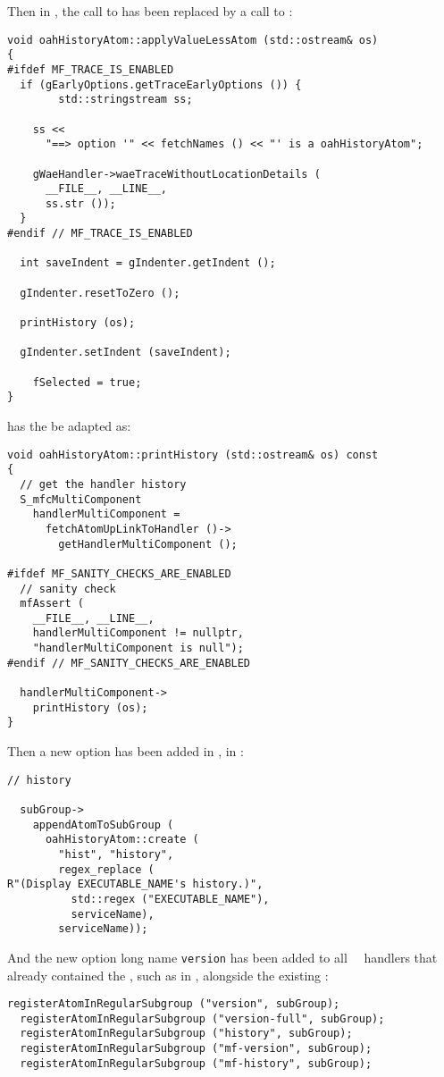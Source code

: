 Then in , the call to  has been replaced by a call to :
\begin{lstlisting}[language=CPlusPlus]
void oahHistoryAtom::applyValueLessAtom (std::ostream& os)
{
#ifdef MF_TRACE_IS_ENABLED
  if (gEarlyOptions.getTraceEarlyOptions ()) {
		std::stringstream ss;

    ss <<
      "==> option '" << fetchNames () << "' is a oahHistoryAtom";

    gWaeHandler->waeTraceWithoutLocationDetails (
      __FILE__, __LINE__,
      ss.str ());
  }
#endif // MF_TRACE_IS_ENABLED

  int saveIndent = gIndenter.getIndent ();

  gIndenter.resetToZero ();

  printHistory (os);

  gIndenter.setIndent (saveIndent);

	fSelected = true;
}
\end{lstlisting}

\method{}{} has the be adapted as:
\begin{lstlisting}[language=CPlusPlus]
void oahHistoryAtom::printHistory (std::ostream& os) const
{
  // get the handler history
  S_mfcMultiComponent
    handlerMultiComponent =
      fetchAtomUpLinkToHandler ()->
        getHandlerMultiComponent ();

#ifdef MF_SANITY_CHECKS_ARE_ENABLED
  // sanity check
  mfAssert (
    __FILE__, __LINE__,
    handlerMultiComponent != nullptr,
    "handlerMultiComponent is null");
#endif // MF_SANITY_CHECKS_ARE_ENABLED

  handlerMultiComponent->
    printHistory (os);
}
\end{lstlisting}

Then a new option has been added in , in :
\begin{lstlisting}[language=CPlusPlus]
  // history

  subGroup->
    appendAtomToSubGroup (
      oahHistoryAtom::create (
        "hist", "history",
        regex_replace (
R"(Display EXECUTABLE_NAME's history.)",
          std::regex ("EXECUTABLE_NAME"),
          serviceName),
        serviceName));
\end{lstlisting}

And the new option long name {\tt version} has been added to all \regular\ \oahRepr\ handlers that already contained the , such as in , alongside the existing :
\begin{lstlisting}[language=CPlusPlus]
  registerAtomInRegularSubgroup ("version", subGroup);
  registerAtomInRegularSubgroup ("version-full", subGroup);
  registerAtomInRegularSubgroup ("history", subGroup);
  registerAtomInRegularSubgroup ("mf-version", subGroup);
  registerAtomInRegularSubgroup ("mf-history", subGroup);
\end{lstlisting}


